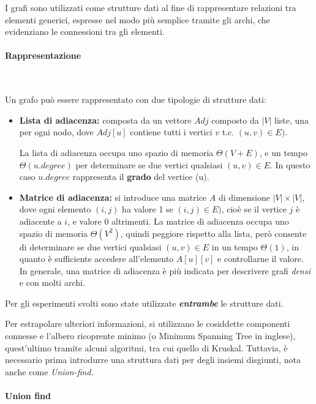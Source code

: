 \documentclass[
]{article}
\begin{document}
I grafi sono utilizzati come strutture dati al fine di rappresentare
relazioni tra elementi generici, espresse nel modo più semplice tramite
gli archi, che evidenziano le connessioni tra gli elementi.

\hypertarget{rappresentazione}{%
\paragraph{Rappresentazione}\label{rappresentazione}}
\

Un grafo può essere rappresentato con due tipologie di strutture dati:

\begin{itemize}
\item
  \textbf{Lista di adiacenza:} composta da un vettore \(Adj\) composto
  da \(|V|\) liste, una per ogni nodo, dove \(Adj[u]\) contiene tutti i
  vertici \(v\) t.c. \((u, v) \in E)\).

  La lista di adiacenza occupa uno spazio di memoria \(\Theta(V + E)\),
  e un tempo \(\Theta(u.degree)\) per determinare se due vertici
  qualsiasi \((u, v) \in E\). In questo caso \(u.degree\) rappresenta il
  \textbf{grado} del vertice (u).
\item
  \textbf{Matrice di adiacenza:} si introduce una matrice \(A\) di
  dimensione \(|V|\times|V|\), dove ogni elemento \((i,j)\) ha valore 1
  se \((i, j) \in E)\), cioè se il vertice \(j\) è adiacente a \(i\), e
  valore 0 altrimenti. La matrice di adiacenza occupa uno spazio di
  memoria \(\Theta(V^2)\), quindi peggiore rispetto alla lista, però
  consente di determinare se due vertici qualsiasi \((u, v) \in E\) in
  un tempo \(\Theta(1)\), in quanto è sufficiente accedere all'elemento
  \(A[u][v]\) e controllarne il valore. In generale, una matrice di
  adiacenza è più indicata per descrivere grafi \emph{densi} e con molti
  archi.
\end{itemize}

Per gli esperimenti svolti sono state utilizzate
\textbf{\emph{entrambe}} le strutture dati.

Per estrapolare ulteriori informazioni, si utilizzano le cosiddette
componenti connesse e l'albero ricoprente minimo (o Minimum Spanning
Tree in inglese), quest'ultimo tramite alcuni algoritmi, tra cui quello
di Kruskal. Tuttavia, è necessario prima introdurre una struttura dati
per degli insiemi disgiunti, nota anche come \emph{Union-find.}

\hypertarget{union-find}{%
\paragraph{Union find}\label{union-find}}
\
\end{document}
